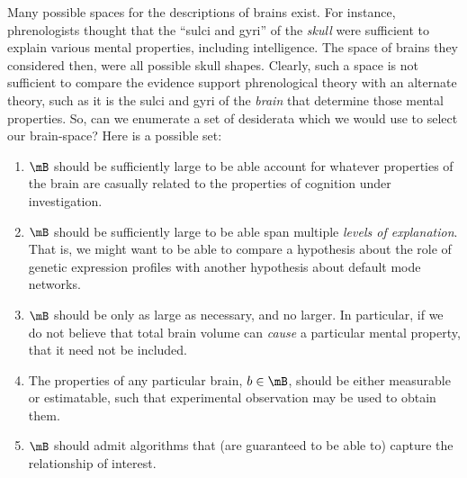 Many possible spaces for the descriptions of brains exist. For instance, phrenologists thought that the ``sulci and gyri'' of the \emph{skull} were sufficient to explain various mental properties, including intelligence. The space of brains they considered then, were all possible skull shapes. Clearly, such a space is not sufficient to compare the evidence support phrenological theory with an alternate theory, such as it is the sulci and gyri of the \emph{brain} that determine those mental properties. So, can we enumerate a set of desiderata which we would use to select our brain-space? Here is a possible set:
\begin{enumerate}
	\item $\mB$ should be sufficiently large to be able account for whatever properties of the brain are casually related to the properties of cognition under investigation. 
	\item $\mB$ should be sufficiently large to be able span multiple \emph{levels of explanation}. That is, we might want to be able to compare a hypothesis about the role of genetic expression profiles with another hypothesis about default mode networks. 
	\item $\mB$ should be only as large as necessary, and no larger. In particular, if we do not believe that total brain volume can \emph{cause} a particular mental property, that it need not be included. 
	\item The properties of any particular brain, $b\in \mB$, should be either measurable or estimatable, such that experimental observation may be used to obtain them.	%
	\item $\mB$ should admit algorithms that (are guaranteed to be able to) capture the relationship of interest. 
\end{enumerate}

